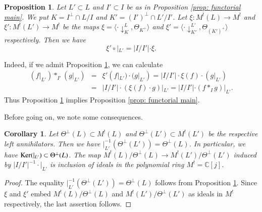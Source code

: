 \documentclass[12pt]{amsart}
\numberwithin{equation}{section}
\newtheorem{proposition}[theorem]{Proposition}
\newtheorem{corollary}[theorem]{Corollary}
\theoremstyle{definition}
\theoremstyle{remark}
\newcommand{\C}{\mathbb{C}}
\newcommand{\pushLK}{\downarrow^{L}_{K}}
\newcommand{\ThetaK}{\Theta_{K^{+}}}
\newcommand{\ML}{M^{!}(L)}
\begin{document}
\begin{proposition}\label{prop: functorial}
Let $L'\subset L$ and $I'\subset I$ be as in Proposition \ref{prop: functorial main}. 
We put $K=I^{\perp}\cap L / I$ and $K'=(I')^{\perp}\cap L'/I'$. 
Let 
$\xi \colon {\ML}\to M^{!}$ and 
$\xi' \colon M^{!}(L')\to M^{!}$ be the maps 
$\xi= \langle \cdot {\pushLK}, {\ThetaK} \rangle$ and 
$\xi'= \langle \cdot \! \downarrow^{L'}_{K'}, \Theta_{(K')^{+}} \rangle$ 
respectively. 
Then we have 
\begin{equation*}
\xi' \circ |_{L'} = |I/I'| \cdot \xi. 
\end{equation*}
\end{proposition}

Indeed, if we admit Proposition \ref{prop: functorial}, we can calculate 
\begin{eqnarray*}
(f|_{L'})\ast_{I'}(g|_{L'}) 
& = & 
\xi'(f|_{L'})\cdot (g|_{L'}) 
= |I/I'| \cdot \xi(f) \cdot (g|_{L'}) \\ 
& = & 
|I/I'| \cdot (\xi(f)\cdot g)|_{L'} 
= |I/I'| \cdot (f\ast_{I}g)|_{L'}. 
\end{eqnarray*}
Thus Proposition \ref{prop: functorial} implies Proposition \ref{prop: functorial main}. 

Before going on, we note some consequences.  

\begin{corollary}\label{cor: functorial add consequence}
Let $\Theta^{\perp}(L)\subset {\ML}$ and 
$\Theta^{\perp}(L')\subset M^!(L')$ be 
the respective left annihilators. 
Then we have 
$|_{L'}^{-1}(\Theta^{\perp}(L'))=\Theta^{\perp}(L)$. 
In particular, we have 
${\rm Ker}(|_{L'})\subset \Theta^{\perp}(L)$. 
The map 
${\ML}/\Theta^{\perp}(L) \to M^!(L')/\Theta^{\perp}(L')$ 
induced by $|I/I'|^{-1}\cdot |_{L'}$ 
is inclusion of ideals in the polynomial ring $M^!={\C}[j]$. 
\end{corollary}

\begin{proof}
The equality 
$|_{L'}^{-1}(\Theta^{\perp}(L'))=\Theta^{\perp}(L)$ 
follows from Proposition \ref{prop: functorial}. 
Since $\xi$ and $\xi'$ embed 
${\ML}/\Theta^{\perp}(L)$ and $M^!(L')/\Theta^{\perp}(L')$ 
as ideals in $M^!$ respectively, 
the last assertion follows.  
\end{proof}
\end{document}
